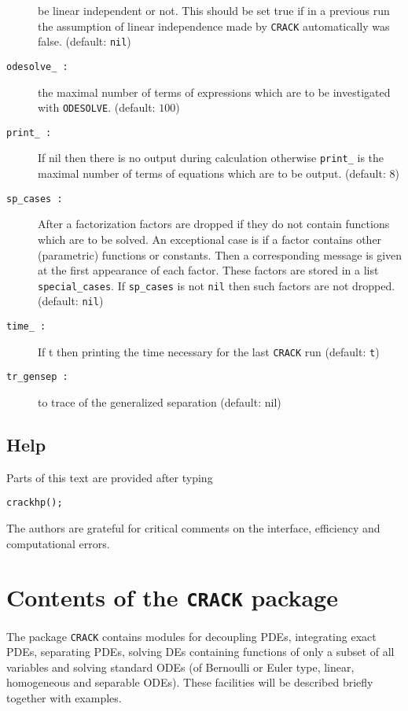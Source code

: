 \begin{description}
             be linear independent or not. This should be set true if
             in a previous run the assumption of linear independence made by
             {\tt CRACK} automatically was false. (default: {\tt nil})  
\item[{\tt odesolve\_ :}] the maximal number of terms of expressions which
             are to be 
             investigated with {\tt ODESOLVE}.  (default: $100$) 
\item[{\tt print\_ :}] If nil then there is no output during calculation
             otherwise {\tt print\_} is the maximal number of terms
             of equations which are to be output. (default: 8)  
\item[{\tt sp\_cases :}] After a factorization factors are dropped
             if they do not contain functions which are to be solved. An
             exceptional case is if a factor contains other (parametric)
             functions or constants. Then a corresponding message is given
             at the first appearance of each factor. These factors are
             stored in a list {\tt special\_cases}. If {\tt sp\_cases}
             is not {\tt nil} then such factors are not dropped. 
             (default: {\tt nil})
\item[{\tt time\_ :}] If t then printing the time necessary for the last
             {\tt CRACK} run (default: {\tt t}) 
\item[{\tt tr\_gensep :}] to trace of the generalized separation 
             (default: nil)
\end{description}

\subsection{Help}
Parts of this text are provided after typing 

{\tt crackhp();}

The authors are grateful for critical comments 
on the interface, efficiency and computational errors.

\section{Contents of the {\tt CRACK} package}
The package {\tt CRACK} contains modules for decoupling PDEs, integrating
exact PDEs, separating PDEs, solving DEs containing functions of only
a subset of all variables and solving standard ODEs (of Bernoulli or
Euler type, linear, homogeneous and separable ODEs). These facilities
will be described briefly together with examples.

